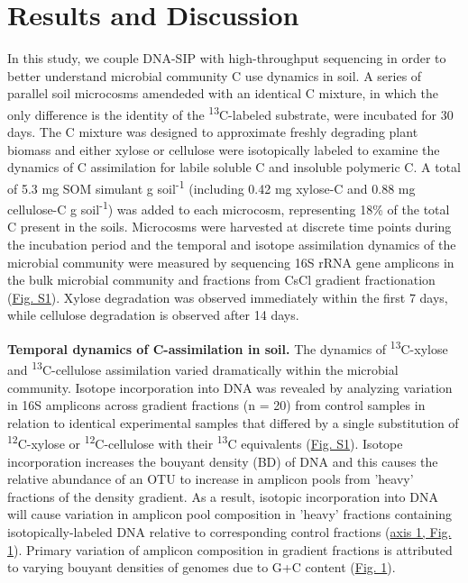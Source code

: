 \section{Results and Discussion}

In this study, we couple DNA-SIP with high-throughput sequencing in order to better understand microbial community C use dynamics in soil. A series of parallel soil microcosms amendeded with an identical C mixture, in which the only difference is the identity of the \textsuperscript{13}C-labeled substrate, were incubated for 30 days. The C mixture was designed to approximate freshly degrading plant biomass and either xylose or cellulose were isotopically labeled to examine the dynamics of C assimilation for labile soluble C and insoluble polymeric C. A total of 5.3 mg SOM simulant g soil\textsuperscript{-1} (including 0.42 mg xylose-C and 0.88 mg cellulose-C g soil\textsuperscript{-1}) was added to each microcosm, representing 18\% of the total C present in the soils. Microcosms were harvested at discrete time points during the incubation period and the temporal and isotope assimilation dynamics of the microbial community were measured by sequencing 16S rRNA gene amplicons in the bulk microbial community and fractions from CsCl gradient fractionation (\href{https://www.authorea.com/users/3537/articles/8459/master/file/figures/20140708_ConceptualFig2/20140708_ConceptualFig2.pdf}{Fig. S1}). Xylose degradation was observed immediately within the first 7 days, while cellulose degradation is observed after 14 days.

\textbf{Temporal dynamics of C-assimilation in soil.}  
The dynamics of \textsuperscript{13}C-xylose and \textsuperscript{13}C-cellulose assimilation varied dramatically within the microbial community. Isotope incorporation into DNA was revealed by analyzing variation in 16S amplicons across gradient fractions (n = 20) from control samples in relation to identical experimental samples that differed by a single substitution of \textsuperscript{12}C-xylose or \textsuperscript{12}C-cellulose with their \textsuperscript{13}C equivalents (\href{https://www.authorea.com/users/3537/articles/8459/master/file/figures/20140708_ConceptualFig2/20140708_ConceptualFig2.pdf}{Fig. S1}). Isotope incorporation increases the bouyant density (BD) of DNA and this causes the relative abundance of an OTU to increase in amplicon pools from 'heavy' fractions of the density gradient. As a result, isotopic incorporation into DNA will cause variation in amplicon pool composition in 'heavy' fractions containing isotopically-labeled DNA relative to corresponding control fractions (\href{https://www.authorea.com/users/3537/articles/3612/master/file/figures/ordination_all1/ordination_all1.png}{axis 1, Fig. 1}). Primary variation of amplicon composition in gradient fractions is attributed to varying bouyant densities of genomes due to G+C content (\href{https://www.authorea.com/users/3537/articles/3612/master/file/figures/ordination_all1/ordination_all1.png}{Fig. 1}). 

